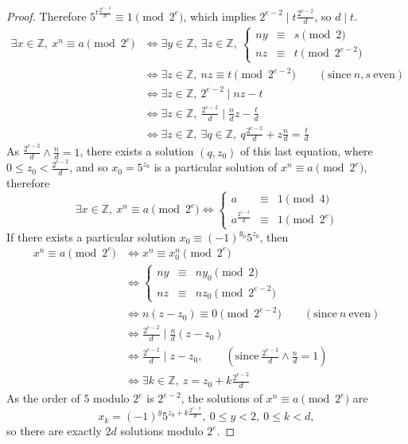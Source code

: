 \documentclass[11pt,a4paper]{article}
\newcommand{\Z}{\mathbb{Z}}
\begin{document}
\begin{proof}
Therefore $5^{t \frac{2^{e-2}}{d}} \equiv 1 \pmod {2^e}$, which  implies $2^{e-2} \mid t \frac{2^{e-2}}{d}$, so $d \mid t$.
\begin{align*}
\exists x \in \Z,\ x^n\equiv a \pmod{2^e} &\iff \exists y \in \Z,\ \exists z \in \Z,\ \left\{
\begin{array}{ccl}
  ny& \equiv   &s \pmod{2}   \\
  nz& \equiv  &    t\pmod {2^{e-2}}
\end{array}
\right.\\
&\iff \exists z \in \Z,\ nz \equiv t \pmod{2^{e-2}}\qquad (\mathrm{since}\ n,s\ \mathrm{even})\\
&\iff \exists z \in \Z,\ 2^{e-2} \mid nz - t\\
&\iff \exists z \in \Z,\ \frac{2^{e-2}}{d} \mid \frac{n}{d} z - \frac{t}{d}\\
&\iff \exists z \in \Z,\ \exists q \in \Z, \ q \frac{2^{e-2}}{d} + z \frac{n}{d}   = \frac{t}{d}
\end{align*}
As $\frac{2^{e-2}}{d} \wedge \frac{n}{d} = 1$, there exists a solution $(q,z_0)$ of this last equation, where $0\leq z_0 < \frac{2^{e-2}}{d}$, and so $x_0 = 5^{z_0}$ is a particular solution of $x^n\equiv a \pmod{2^e}$, therefore
 $$\exists x \in \Z,\ x^n\equiv a \pmod{2^e} \iff
 \left\{
 \begin{array}{ccl}
  a& \equiv   &1 \pmod{4}   \\
  a^{\frac{2^{e-2}}{d}} & \equiv  &    1 \pmod {2^{e}}
\end{array}
\right.
$$
If there exists a particular solution $x_0 \equiv (-1)^{y_0}5^{z_0}$, then
\begin{align*}
x^n \equiv a \pmod{2^e} &\iff x^n\equiv x_0^n \pmod {2^e}\\
&\iff
\left\{
\begin{array}{ccl}
  ny& \equiv   &ny_0 \pmod{2}   \\
  nz& \equiv  & nz_0   \pmod {2^{e-2}}
\end{array}
\right.\\
&\iff n(z -z_0)\equiv   0   \pmod {2^{e-2}} \qquad(\mathrm{since}\ n\  \mathrm{even})\\
&\iff \frac{2^{e-2}}{d} \mid \frac{n}{d} (z-z_0)\\
&\iff \frac{2^{e-2}}{d} \mid z-z_0,\qquad (\mathrm{since} \ \frac{2^{e-2}}{d} \wedge \frac{n}{d} = 1)\\
&\iff \exists k \in \Z, \ z = z_0+ k \frac{2^{e-2}}{d}
\end{align*}
As the order of $5$ modulo $2^e$ is $2^{e-2}$, the solutions of $x^n \equiv a \pmod{2^e}$ are $$x_k = (-1)^y 5^{z_0+ k \frac{2^{e-2}}{d}},\  0\leq y < 2,\  0\leq k < d,$$ so there are exactly $2d$ solutions modulo $2^e$.
\end{proof}
\end{document}
